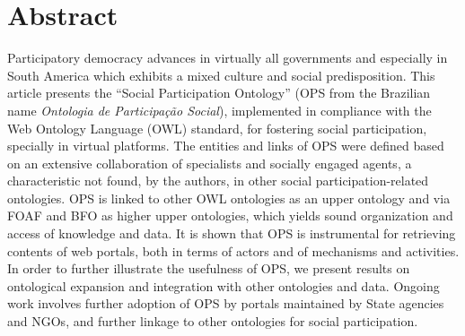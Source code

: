 \documentclass[10pt,letterpaper]{article}
\begin{document}
\section*{Abstract}
Participatory democracy advances in virtually all governments and especially in South America
which exhibits a mixed culture and social predisposition.
This article presents the ``Social Participation Ontology'' 
(OPS from the Brazilian name \emph{Ontologia de Participação Social}),
implemented in compliance with the Web Ontology Language (OWL) standard,
for fostering social participation, specially in virtual platforms.
The entities and links of OPS were defined based on an extensive collaboration of specialists
and socially engaged agents, a characteristic not found, by the authors,
in other social participation-related ontologies.
OPS is linked to other OWL ontologies as an upper ontology
and via FOAF and BFO as higher upper ontologies,
which yields sound organization and access of knowledge and data.
It is shown that OPS is instrumental for retrieving contents of web portals,
both in terms of actors and of mechanisms and activities.
In order to further illustrate the usefulness of OPS, we present results on ontological expansion
and integration with other ontologies and data.
Ongoing work involves further adoption of OPS by
portals maintained by State agencies and NGOs,
and further linkage to other ontologies for social participation.

\end{document}
